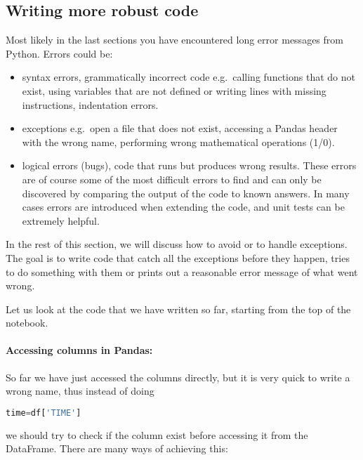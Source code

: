 \documentclass[graybox,sectrefs,envcountresetchap,open=right,final]{svmonodo}
\begin{document}
\subsection{Writing more robust code}
Most likely in the last sections you have encountered long error messages from Python. Errors could be:
\begin{itemize}
\item syntax errors, grammatically incorrect code e.g.~calling functions that do not exist, using variables that are not defined or writing lines with missing instructions, indentation errors. 

\item exceptions e.g.~open a file that does not exist, accessing a Pandas header with the wrong name, performing wrong mathematical operations (1/0).

\item logical errors (bugs), code that runs but produces wrong results. These errors are of course some of the most difficult errors to find and can only be discovered by comparing the output of the code to known answers. In many cases errors are introduced when extending the code, and unit tests can be extremely helpful.
\end{itemize}

\noindent
In the rest of this section, we will discuss how to avoid or to handle exceptions. The goal is to write code that catch all the exceptions before they happen, tries to do something with them or prints out a reasonable error message of what went wrong.

Let us look at the code that we have written so far, starting from the top of the notebook.

\paragraph{Accessing columns in Pandas:}
So far we have just accessed the columns directly, but it is very quick to write a wrong name, thus instead of doing


\begin{lstlisting}[language=python,style=blue1bar]
time=df['TIME']

\end{lstlisting}

we should try to check if the column exist before accessing it from the DataFrame. There are many ways of achieving this:
\end{document}
